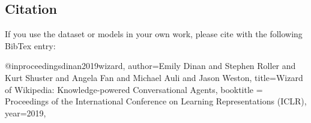 \subsection*{Citation}

If you use the dataset or models in your own work, please cite with the following Bib\+Tex entry\+: \begin{DoxyVerb}@inproceedings{dinan2019wizard,
  author={Emily Dinan and Stephen Roller and Kurt Shuster and Angela Fan and Michael Auli and Jason Weston},
  title={{W}izard of {W}ikipedia: Knowledge-powered Conversational Agents},
  booktitle = {Proceedings of the International Conference on Learning Representations (ICLR)},
  year={2019},
}\end{DoxyVerb}
 